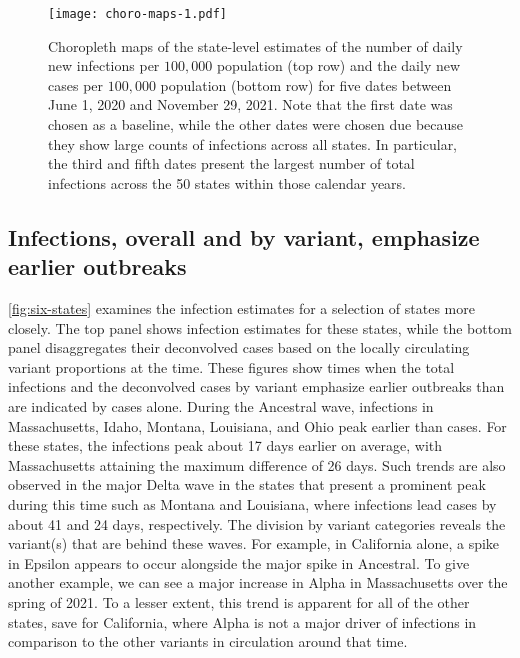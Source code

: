 \begin{figure}[!tb]
\centering
\texttt{[image: choro-maps-1.pdf]}
\caption{Choropleth maps of the state-level estimates of the number of daily new
infections per $100,000$ population (top row) and the daily new cases per
$100,000$ population (bottom row) for five dates between June 1, 2020 and
November 29, 2021. Note that the first date was chosen as a baseline, while the
other dates were chosen due because they show large counts of infections across all
states. In particular, the third and fifth dates present the largest number of
total infections across the 50 states within those calendar years.} 
\label{fig:choro_inf_case_rates}
\end{figure}    



    
\subsection{Infections, overall and by variant, emphasize earlier outbreaks}
\label{sec:infections-by-voc}

\autoref{fig:six-states} examines the infection estimates for a selection of
states more closely. The top panel shows infection estimates for these states,
while the bottom panel disaggregates their deconvolved cases based on the locally
circulating variant proportions at the time. These figures show times when the
total infections and the deconvolved cases by variant emphasize earlier
outbreaks than are indicated by cases alone. During the Ancestral
wave, infections in Massachusetts, Idaho, Montana, Louisiana, and Ohio peak earlier
than cases. For these states, the infections peak about 17 days
earlier on average, with Massachusetts attaining the maximum difference of 26 days.
Such trends are also observed in the 
major Delta wave in the states that present a prominent peak during this time
such as Montana and Louisiana,
where infections lead cases by about 41 and 24 days, respectively.
The division by variant categories reveals the variant(s) that are behind these waves. For
example, in California alone, a spike in Epsilon appears to occur 
alongside the major spike in Ancestral. To give another example, 
we can see a major increase in Alpha in Massachusetts over the spring
of 2021. To a lesser extent, this trend is apparent for all of the other states,
save for California, where Alpha is not a major driver of infections in
comparison to the other variants in circulation around that time. 

